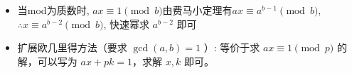 \begin{itemize}
    \item 当mod为质数时, $ax\equiv 1 \pmod b$由费马小定理有$ax\equiv a^{b-1}\pmod b$, $\therefore x\equiv a^{b-2} \pmod b$, 快速幂求 $a^{b-2}$ 即可
    \item 扩展欧几里得方法（要求 $\gcd(a,b)=1$ ）: 等价于求 $ax\equiv 1\pmod p$ 的解，可以写为 $ax+pk = 1$，求解 $x,k$ 即可。
\end{itemize}